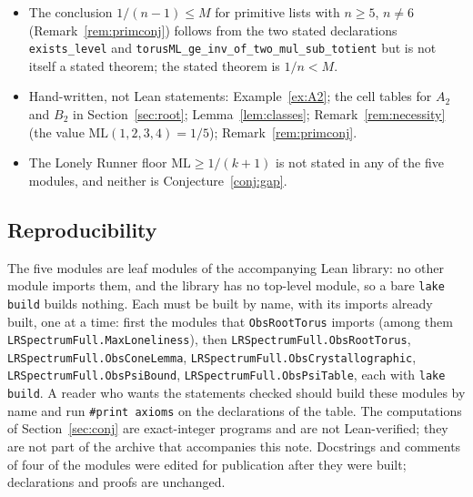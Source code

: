\documentclass[11pt]{amsart}
\theoremstyle{definition}
\theoremstyle{remark}
\newcommand{\ML}{\mathrm{ML}}
\newcommand{\lean}[1]{\texttt{#1}}
\begin{document}
\begin{itemize}[leftmargin=1.5em]
\item The conclusion $1/(n-1)\le M$ for primitive lists with $n\ge5$, $n\ne6$ (Remark~\ref{rem:primconj}) follows from the two stated declarations \lean{exists\_level} and \lean{torusML\_ge\_inv\_of\_two\_mul\_sub\_totient} but is not itself a stated theorem; the stated theorem is $1/n<M$.
\item Hand-written, not Lean statements: Example~\ref{ex:A2}; the cell tables for $A_2$ and $B_2$ in Section~\ref{sec:root}; Lemma~\ref{lem:classes}; Remark~\ref{rem:necessity} (the value $\ML(1,2,3,4)=1/5$); Remark~\ref{rem:primconj}.
\item The Lonely Runner floor $\ML\ge1/(k+1)$ is not stated in any of the five modules, and neither is Conjecture~\ref{conj:gap}.
\end{itemize}

\subsection*{Reproducibility}
{\sloppy The five modules are leaf modules of the accompanying Lean library: no other module imports them, and the library has no top-level module, so a bare \texttt{lake build} builds nothing. Each must be built by name, with its imports already built, one at a time: first the modules that \lean{ObsRootTorus} imports (among them \lean{LRSpectrumFull.MaxLoneliness}), then \lean{LRSpectrumFull.ObsRootTorus}, \lean{LRSpectrumFull.ObsConeLemma}, \lean{LRSpectrumFull.ObsCrystallographic}, \lean{LRSpectrumFull.ObsPsiBound}, \lean{LRSpectrumFull.ObsPsiTable}, each with \texttt{lake build}. A reader who wants the statements checked should build these modules by name and run \texttt{\#print axioms} on the declarations of the table. The computations of Section~\ref{sec:conj} are exact-integer programs and are not Lean-verified; they are not part of the archive that accompanies this note. Docstrings and comments of four of the modules were edited for publication after they were built; declarations and proofs are unchanged.\par}
\end{document}
